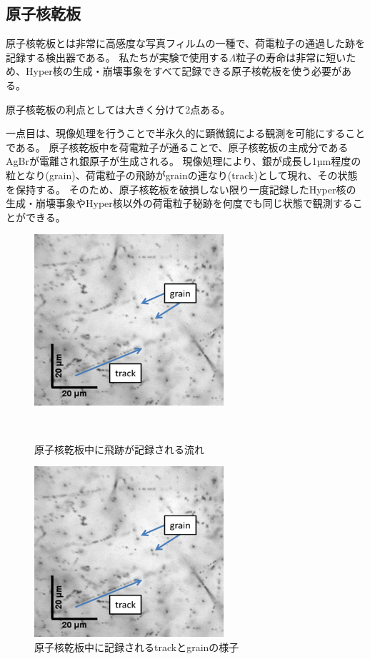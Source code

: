 \documentclass[12pt,a4paper]{jarticle}
\begin{document}
\subsection{原子核乾板}
原子核乾板とは非常に高感度な写真フィルムの一種で、荷電粒子の通過した跡を記録する検出器である。
私たちが実験で使用する$\Lambda$粒子の寿命は非常に短いため、Hyper核の生成・崩壊事象をすべて記録できる原子核乾板を使う必要がある。
\par
原子核乾板の利点としては大きく分けて2点ある。
\par
一点目は、現像処理を行うことで半永久的に顕微鏡による観測を可能にすることである。
原子核乾板中を荷電粒子が通ることで、原子核乾板の主成分であるAgBrが電離され銀原子が生成される。
現像処理により、銀が成長し1µm程度の粒となり(grain)、荷電粒子の飛跡がgrainの連なり(track)として現れ、その状態を保持する。
そのため、原子核乾板を破損しない限り一度記録したHyper核の生成・崩壊事象やHyper核以外の荷電粒子秘跡を何度でも同じ状態で観測することができる。
\par
\begin{figure}[htbp]
    \begin{center}
     \includegraphics[width=70mm]{grainfog.png}
    \end{center}
　　\caption{原子核乾板中に飛跡が記録される流れ\label{fig:process_recored_track}}
\end{figure}
\begin{figure}[htbp]
 \begin{center}
  \includegraphics[width=70mm]{grainfog.png}
 \end{center}
 \caption{原子核乾板中に記録されるtrackとgrainの様子\label{fig:grain_track}}
\end{figure}
\end{document}
